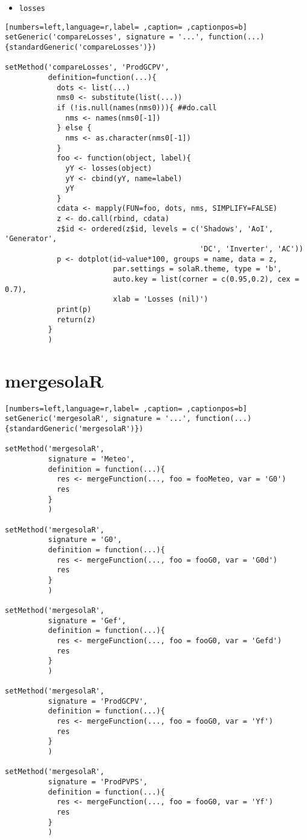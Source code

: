 \begin{itemize}
\item \texttt{losses}
\end{itemize}
\begin{lstlisting}[numbers=left,language=r,label= ,caption= ,captionpos=b]
setGeneric('compareLosses', signature = '...', function(...){standardGeneric('compareLosses')})

setMethod('compareLosses', 'ProdGCPV',
          definition=function(...){
            dots <- list(...)
            nms0 <- substitute(list(...))
            if (!is.null(names(nms0))){ ##do.call
              nms <- names(nms0[-1])
            } else {
              nms <- as.character(nms0[-1])
            }
            foo <- function(object, label){
              yY <- losses(object)
              yY <- cbind(yY, name=label)
              yY
            }
            cdata <- mapply(FUN=foo, dots, nms, SIMPLIFY=FALSE)
            z <- do.call(rbind, cdata)
            z$id <- ordered(z$id, levels = c('Shadows', 'AoI', 'Generator',
                                             'DC', 'Inverter', 'AC'))
            p <- dotplot(id~value*100, groups = name, data = z,
                         par.settings = solaR.theme, type = 'b',
                         auto.key = list(corner = c(0.95,0.2), cex = 0.7),
                         xlab = 'Losses (nil)')
            print(p)
            return(z)
          }
          )
\end{lstlisting}
\section{mergesolaR}
\label{sec:org483f559}
\begin{lstlisting}[numbers=left,language=r,label= ,caption= ,captionpos=b]
setGeneric('mergesolaR', signature = '...', function(...){standardGeneric('mergesolaR')})

setMethod('mergesolaR',
          signature = 'Meteo',
          definition = function(...){
            res <- mergeFunction(..., foo = fooMeteo, var = 'G0')
            res
          }
          )

setMethod('mergesolaR',
          signature = 'G0',
          definition = function(...){
            res <- mergeFunction(..., foo = fooG0, var = 'G0d')
            res
          }
          )

setMethod('mergesolaR',
          signature = 'Gef',
          definition = function(...){
            res <- mergeFunction(..., foo = fooG0, var = 'Gefd')
            res
          }
          )

setMethod('mergesolaR',
          signature = 'ProdGCPV',
          definition = function(...){
            res <- mergeFunction(..., foo = fooG0, var = 'Yf')
            res
          }
          )

setMethod('mergesolaR',
          signature = 'ProdPVPS',
          definition = function(...){
            res <- mergeFunction(..., foo = fooG0, var = 'Yf')
            res
          }
          )
\end{lstlisting}
